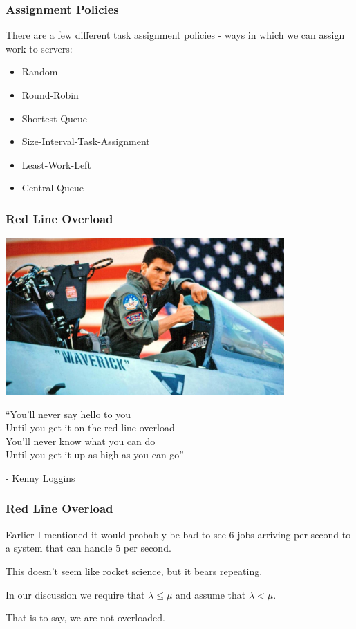 \begin{frame}
\frametitle{Assignment Policies}

There are a few different task assignment policies - ways in which we can assign work to servers:

\begin{itemize}
	\item Random
	\item Round-Robin
	\item Shortest-Queue
	\item Size-Interval-Task-Assignment
	\item Least-Work-Left
	\item Central-Queue
\end{itemize}

\end{frame}


\begin{frame}
\frametitle{Red Line Overload}

\begin{center}
	\includegraphics[width=0.8\textwidth]{images/topgun.jpg}
\end{center}

``You'll never say hello to you\\
Until you get it on the red line overload\\
You'll never know what you can do\\
Until you get it up as high as you can go''
 
\hfill - Kenny Loggins


\end{frame}



\begin{frame}
\frametitle{Red Line Overload}

Earlier I mentioned it would probably be bad to see 6 jobs arriving per second to a system that can handle 5 per second. 

This doesn't seem like rocket science, but it bears repeating. 

In our discussion we require that $\lambda \leq \mu$ and assume that $\lambda < \mu$. 

That is to say, we are not overloaded.

\end{frame}




